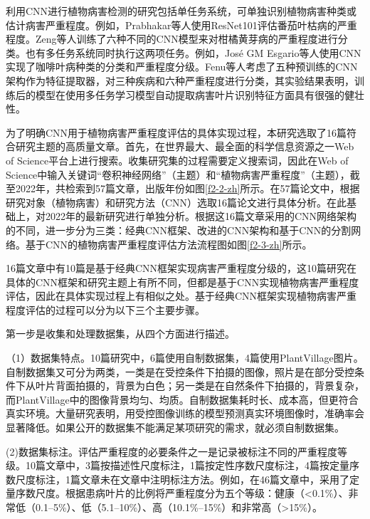 利用CNN进行植物病害检测的研究包括单任务系统，可单独识别植物病害种类或估计病害严重程度。例如，Prabhakar等人使用ResNet101评估番茄叶枯病的严重程度。Zeng等人训练了六种不同的CNN模型来对柑橘黄芽病的严重程度进行分类。也有多任务系统同时执行这两项任务。例如，José GM Esgario等人使用CNN实现了咖啡叶病种类的分类和严重程度分级。Fenu等人考虑了五种预训练的CNN架构作为特征提取器，对三种疾病和六种严重程度进行分类，其实验结果表明，训练后的模型在使用多任务学习模型自动提取病害叶片识别特征方面具有很强的健壮性。


为了明确CNN用于植物病害严重程度评估的具体实现过程，本研究选取了16篇符合研究主题的高质量文章。首先，在世界最大、最全面的科学信息资源之一Web of Science平台上进行搜索。收集研究集的过程需要定义搜索词，因此在Web of Science中输入关键词“卷积神经网络”（主题）和“植物病害严重程度”（主题），截至2022年，共检索到57篇文章，出版年份如图\ref{f2-2-zh}所示。在57篇论文中，根据研究对象（植物病害）和研究方法（CNN）选取16篇论文进行具体分析。在此基础上，对2022年的最新研究进行单独分析。根据这16篇文章采用的CNN网络架构的不同，进一步分为三类：经典CNN框架、改进的CNN架构和基于CNN的分割网络。基于CNN的植物病害严重程度评估方法流程图如图\ref{f2-3-zh}所示。



16篇文章中有10篇是基于经典CNN框架实现病害严重程度分级的，这10篇研究在具体的CNN框架和研究主题上有所不同，但都是基于CNN实现植物病害严重程度评估，因此在具体实现过程上有相似之处。基于经典CNN框架实现植物病害严重程度评估的过程可以分为以下三个主要步骤。

第一步是收集和处理数据集，从四个方面进行描述。

（1）数据集特点。10篇研究中，6篇使用自制数据集，4篇使用PlantVillage图片。自制数据集又可分为两类，一类是在受控条件下拍摄的图像，照片是在部分受控条件下从叶片背面拍摄的，背景为白色；另一类是在自然条件下拍摄的，背景复杂，而PlantVillage中的图像背景均匀、均质。自制数据集耗时长、成本高，但更符合真实环境。大量研究表明，用受控图像训练的模型预测真实环境图像时，准确率会显著降低。如果公开的数据集不能满足某项研究的需求，就必须自制数据集。

(2)数据集标注。评估严重程度的必要条件之一是记录被标注不同的严重程度等级。10篇文章中，3篇按描述性尺度标注，1篇按定性序数尺度标注，4篇按定量序数尺度标注，1篇文章未在文章中注明标注方法。例如，在46篇文章中，采用了定量序数尺度。根据患病叶片的比例将严重程度分为五个等级：健康（<0.1\%）、非常低（0.1–5\%）、低（5.1–10\%）、高（10.1\%–15\%）和非常高（>15\%）。

